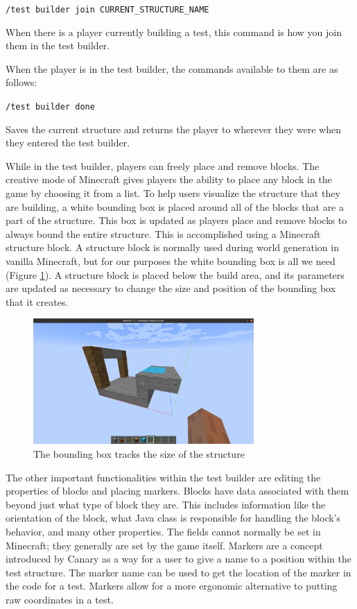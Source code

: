 \documentclass[12pt]{article}
\def\code#1{\texttt{#1}}
\begin{document}
\begin{onehalfspacing}
\noindent\code{/test builder join CURRENT\_STRUCTURE\_NAME}

When there is a player currently building a test, this command is how
you join them in the test builder.

When the player is in the test builder, the commands available to them
are as follows:

\noindent\code{/test builder done}

Saves the current structure and returns the player to wherever they were
when they entered the test builder.

While in the test builder, players can freely place and remove blocks.
The creative mode of Minecraft gives players the ability to place any
block in the game by choosing it from a list. To help users visualize
the structure that they are building, a white bounding box is placed
around all of the blocks that are a part of the structure. This box is
updated as players place and remove blocks to always bound the entire
structure. This is accomplished using a Minecraft structure block. A
structure block is normally used during world generation in vanilla
Minecraft, but for our purposes the white bounding box is all we need
(Figure \ref{fig:4_1_3}). A structure block is placed below the build area, and
its parameters are updated as necessary to change the size and position
of the bounding box that it creates.

\begin{figure}[h] 
    \centering
    \includegraphics[width=0.75\textwidth]{media/media/image11.png} 
    \caption{The bounding box tracks the size of the structure} 
    \label{fig:4_1_3}  
\end{figure}


The other important functionalities within the test builder are editing
the properties of blocks and placing markers. Blocks have data
associated with them beyond just what type of block they are. This
includes information like the orientation of the block, what Java class
is responsible for handling the block's behavior, and many other
properties. The fields cannot normally be set in Minecraft; they
generally are set by the game itself. Markers are a concept introduced
by Canary as a way for a user to give a name to a position within the
test structure. The marker name can be used to get the location of the
marker in the code for a test. Markers allow for a more ergonomic
alternative to putting raw coordinates in a test.


\end{onehalfspacing}
\end{document}
